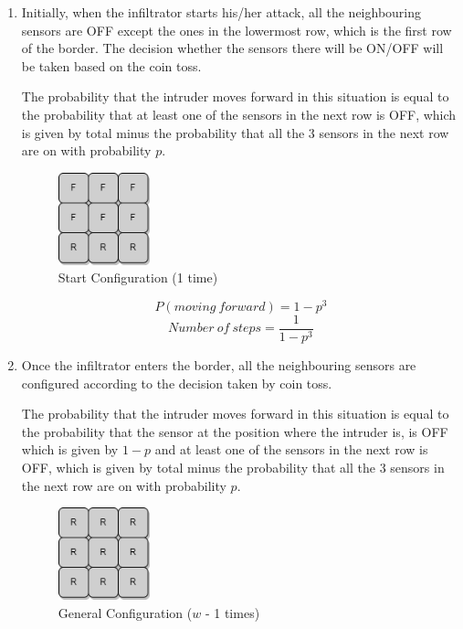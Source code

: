 \documentclass[12pt]{article}
\begin{document}
\begin{enumerate}

    \item Initially, when the infiltrator starts his/her attack, all the neighbouring sensors are OFF except the ones in the lowermost row, which is the first row of the border. The decision whether the sensors there will be ON/OFF will be taken based on the coin toss.
    
    The probability that the intruder moves forward in this situation is equal to the probability that at least one of the sensors in the next row is OFF, which is given by total minus the probability that all the 3 sensors in the next row are on with probability $p$.
    \vspace{50em}
    \begin{figure}[h]
    \centering
    \includegraphics[width=0.25\textwidth]{Start.drawio.png}
    \caption{Start Configuration (1 time)}
    \label{fig:mesh1}
    \end{figure}
\[P(moving\: forward) = 1 - p^3\]
\begin{equation}
Number\: of\: steps = \frac{1}{1 - p^3}
\end{equation}

 \item Once the infiltrator enters the border, all the neighbouring sensors are configured according to the decision taken by coin toss.

The probability that the intruder moves forward in this situation is equal to the probability that the sensor at the position where the intruder is, is OFF which is given by $1 - p$ and at least one of the sensors in the next row is OFF, which is given by total minus the probability that all the 3 sensors in the next row are on with probability $p$.
   
   \begin{figure}[h]
    \centering
    \includegraphics[width=0.25\textwidth]{Middle.drawio.png}
    \caption{General Configuration ($w$ - 1 times)}
    \label{fig:mesh1}
    \end{figure}


\end{enumerate}
\end{document}
